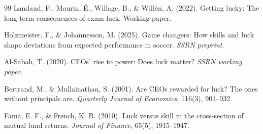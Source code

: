 \begin{thebibliography}{99}
   Landaud, F., Maurin, \'E., Willage, B., \& Will\'en,
    A. (2022). Getting lucky: The long-term consequences of exam luck.
    Working paper.

   Holzmeister, F., \& Johannesson, M. (2025).
    Game changers: How skills and luck shape deviations from expected
    performance in soccer. \textit{SSRN preprint}.

   Al-Sabah, T. (2020). CEOs' rise to power: Does
    luck matter? \textit{SSRN working paper}.

   Bertrand, M., \& Mullainathan, S. (2001). Are
    CEOs rewarded for luck? The ones without principals are. \textit{Quarterly
    Journal of Economics}, 116(3), 901--932.

   Fama, E. F., \& French, K. R. (2010). Luck versus
    skill in the cross-section of mutual fund returns. \textit{Journal
    of Finance}, 65(5), 1915--1947.
\end{thebibliography}
